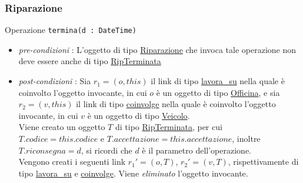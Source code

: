 \documentclass[12pt, letterpaper]{article}
\newcommand{\code}[1]{\colorbox{light-gray}{\texttt{#1}}}
\begin{document}
\subsubsection{Riparazione}
Operazione \code{termina(d : DateTime)}\begin{itemize}
\item  \textit{pre-condizioni} : L'oggetto di tipo \underline{Riparazione} che invoca 
tale operazione non deve essere anche di tipo \underline{RipTerminata}

\item \textit{post-condizioni} : Sia $r_1=(o,this)$ il link di tipo \underline{lavora\_su}
nella quale è coinvolto l'oggetto invocante, in cui $o$ è un oggetto di tipo \underline{Officina}, 
e sia $r_2=(v,this)$ il link di tipo \underline{coinvolge}
nella quale è coinvolto l'oggetto invocante, in cui $v$ è un oggetto di tipo \underline{Veicolo}.\\

Viene creato un oggetto $T$ di tipo \underline{RipTerminata}, per cui $T.codice=this.codice$ e 
$T.accettazione=this.accettazione$, inoltre $T.riconsegna=d$, si ricordi che $d$ è il parametro 
dell'operazione.\\

Vengono creati i seguenti link $r_1'=(o,T)$, $r_2'=(v,T)$, rispettivamente di tipo \underline{lavora\_su} 
e \underline{coinvolge}. Viene \textit{eliminato} l'oggetto invocante.

\end{itemize}
\end{document}
